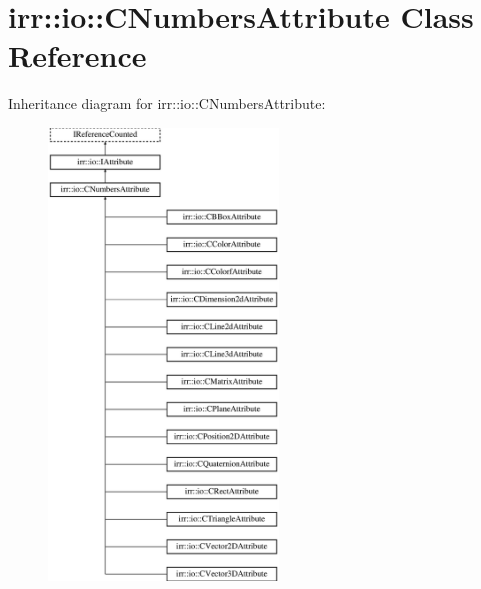 \hypertarget{classirr_1_1io_1_1_c_numbers_attribute}{\section{irr\-:\-:io\-:\-:C\-Numbers\-Attribute Class Reference}
\label{classirr_1_1io_1_1_c_numbers_attribute}
}
Inheritance diagram for irr\-:\-:io\-:\-:C\-Numbers\-Attribute\-:\begin{figure}[H]
\begin{center}
\leavevmode
\includegraphics[height=12.000000cm]{classirr_1_1io_1_1_c_numbers_attribute}
\end{center}
\end{figure}

